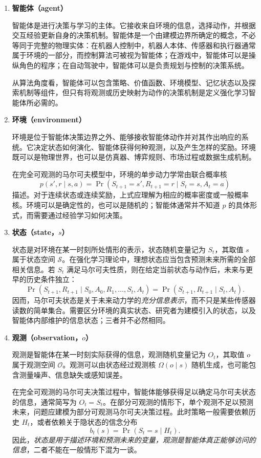 \begin{enumerate}[label=\textbf{\arabic*.},leftmargin=3em]
  \item \textbf{智能体（agent）}


  智能体是进行决策与学习的主体。它接收来自环境的信息，选择动作，并根据交互经验更新自身的决策机制。智能体是一个由建模边界所确定的概念，不必等同于完整的物理实体：在机器人控制中，机器人本体、传感器和执行器通常属于环境的一部分，而控制算法可被视为智能体；在游戏中，智能体可以是操纵角色的程序；在自动驾驶中，智能体可以是负责规划与控制的决策系统。


  从算法角度看，智能体可以包含策略、价值函数、环境模型、记忆状态以及探索机制等组件，但只有将观测或历史映射为动作的决策机制是定义强化学习智能体所必需的。


  \item \textbf{环境（environment）}


  环境是位于智能体决策边界之外、能够接收智能体动作并对其作出响应的系统。它决定状态如何演化、智能体获得何种观测，以及产生怎样的奖励。环境既可以是物理世界，也可以是仿真器、博弈规则、市场过程或数据生成机制。


  在完全可观测的马尔可夫模型中，环境的单步动力学常由联合概率核
  \[
    p(s',r\mid s,a)
    =\Pr\!\left(S_{t+1}=s',R_{t+1}=r\mid S_t=s,A_t=a\right)
  \]
  描述。对于连续状态或连续奖励，上式应理解为相应的概率密度或一般概率核。环境可以是确定性的，也可以是随机的；智能体通常并不知道 $p$ 的具体形式，而需要通过经验学习如何决策。


  \item \textbf{状态（state，$s$）}


  状态是对环境在某一时刻所处情形的表示，状态随机变量记为 $S_t$，其取值 $s$ 属于状态空间 $\mathcal{S}$。在强化学习理论中，理想状态应当包含预测未来所需的全部相关信息。若 $S_t$ 满足马尔可夫性质，则在给定当前状态与动作后，未来与更早的历史条件独立：
  \[
    \Pr(S_{t+1},R_{t+1}\mid S_0,A_0,R_1,\ldots,S_t,A_t)
    =\Pr(S_{t+1},R_{t+1}\mid S_t,A_t).
  \]
  因而，马尔可夫状态是关于未来动力学的\emph{充分信息表示}，而不只是某些传感器读数的简单集合。需要区分环境的真实状态、研究者为建模引入的状态，以及智能体内部维护的信息状态；三者并不必然相同。


  \item \textbf{观测（observation，$o$）}


  观测是智能体在某一时刻实际获得的信息，观测随机变量记为 $O_t$，其取值 $o$ 属于观测空间 $\mathcal{O}$。观测可以由状态经过观测核 $\Omega(o\mid s)$ 随机生成，也可能包含测量噪声、信息缺失或感知误差。


  在完全可观测的马尔可夫决策过程中，智能体能够获得足以确定马尔可夫状态的信息，通常简写为 $O_t=S_t$。在部分可观测的情形下，单个观测不足以预测未来，问题应建模为部分可观测马尔可夫决策过程。此时策略一般需要依赖历史 $H_t$，或者依赖关于隐状态的信念分布
  \[
    b_t(s)=\Pr(S_t=s\mid H_t).
  \]
  因此，\emph{状态是用于描述环境和预测未来的变量，观测是智能体真正能够访问的信息}，二者不能在一般情形下混为一谈。



\end{enumerate}
